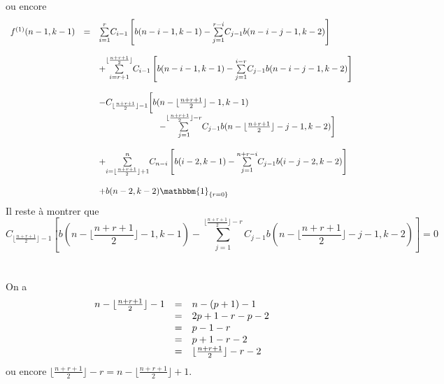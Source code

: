ou encore $$
	\begin{array}{l l l}
		f^{(1)}(n-1,k-1) & =        & \underset{i=1}{\overset{r}{\sum}}C_{i-1}\left[b(n-i-1,k-1)-\underset{j=1}{\overset{r-i}{\sum}}C_{j-1}b(n-i-j-1,k-2)\right]                               \\ &\text{ }&\\ &\text{}&+\underset{i=r+1}{\overset{\lfloor \frac{n+r+1}{2}\rfloor}{\sum}}C_{i-1}\left[b(n-i-1,k-1)-\underset{j=1}{\overset{i-r}{\sum}}C_{j-1}b(n-i-j-1,k-2)\right]\\ &\text{ }&\\
		                 & \text{ } & -C_{\lfloor \frac{n+r+1}{2} \rfloor-1}\biggl[b(n-\lfloor \frac{n+r+1}{2} \rfloor-1, k-1)                                                                 \\ &\text{}& \hspace{70pt} - \underset{j=1}{\overset{ \lfloor \frac{n+r+1}{2} \rfloor-r }{\sum}}C_{j-1}  b(n-\lfloor \frac{n+r+1}{2} \rfloor-j-1, k-2)\biggr]
		\\ &\text{ }&\\
		                 & \text{}  & +\underset{i=\lfloor \frac{n+r+1}{2}\rfloor+1}{\overset{n}{\sum}}C_{n-i}\left[b(i-2,k-1)-\underset{j=1}{\overset{n+r-i}{\sum}}C_{j-1}b(i-j-2,k-2)\right] \\ &\text{ }&\\
		                 & \text{}  & +b(n-2,k-2)\mathbbm{1}_{\{r = 0\}}                                                                                                                       \\
	\end{array}
$$
Il reste à montrer que $$C_{\lfloor \frac{n+r+1}{2} \rfloor-1}\left[ b(n-\lfloor \frac{n+r+1}{2} \rfloor-1, k-1) - \underset{j=1}{\overset{ \lfloor \frac{n+r+1}{2} \rfloor-r }{\sum}}C_{j-1}  b(n-\lfloor \frac{n+r+1}{2} \rfloor-j-1, k-2)\right] = 0$$\\
\vspace{5pt}\\
On a
\[
	\begin{array}{l l l}
		n-\lfloor \frac{n+r+1}{2}\rfloor-1 & = & n-(p+1)-1 \\&=&2p+1-r-p-2\\&=&p-1-r\\&=& p+1-r-2\\&=&\lfloor \frac{n+r+1}{2}\rfloor -r-2
	\end{array}
\]
ou encore  $\lfloor \frac{n+r+1}{2}\rfloor -r=n-\lfloor \frac{n+r+1}{2}\rfloor +1$.\\
